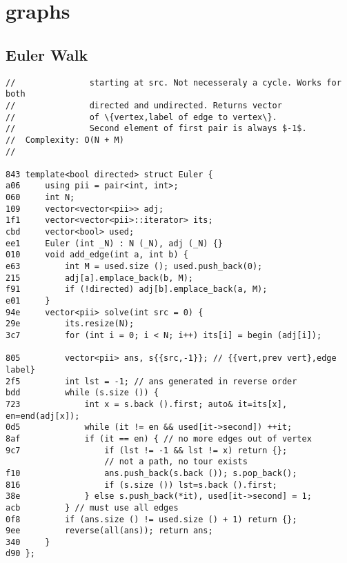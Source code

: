 \documentclass[11pt, a4paper, twoside]{article}
\begin{document}




%
%

\section{graphs}

\subsection{ Euler Walk}
\begin{lstlisting}
//               starting at src. Not necesseraly a cycle. Works for both 
//               directed and undirected. Returns vector 
//               of \{vertex,label of edge to vertex\}.
//               Second element of first pair is always $-1$.
//  Complexity: O(N + M)
//

843 template<bool directed> struct Euler {
a06     using pii = pair<int, int>;
060     int N;
109     vector<vector<pii>> adj; 
1f1     vector<vector<pii>::iterator> its; 
cbd     vector<bool> used;
ee1     Euler (int _N) : N (_N), adj (_N) {}
010     void add_edge(int a, int b) {
e63         int M = used.size (); used.push_back(0); 
215         adj[a].emplace_back(b, M); 
f91         if (!directed) adj[b].emplace_back(a, M);
e01     }
94e     vector<pii> solve(int src = 0) { 
29e         its.resize(N);
3c7         for (int i = 0; i < N; i++) its[i] = begin (adj[i]);
    
805         vector<pii> ans, s{{src,-1}}; // {{vert,prev vert},edge label}
2f5         int lst = -1; // ans generated in reverse order
bdd         while (s.size ()) { 
723             int x = s.back ().first; auto& it=its[x], en=end(adj[x]);
0d5             while (it != en && used[it->second]) ++it;
8af             if (it == en) { // no more edges out of vertex
9c7                 if (lst != -1 && lst != x) return {};
                    // not a path, no tour exists
f10                 ans.push_back(s.back ()); s.pop_back(); 
816                 if (s.size ()) lst=s.back ().first;
38e             } else s.push_back(*it), used[it->second] = 1;
acb         } // must use all edges
0f8         if (ans.size () != used.size () + 1) return {}; 
9ee         reverse(all(ans)); return ans;
340     }
d90 };
\end{lstlisting}
\end{document}
